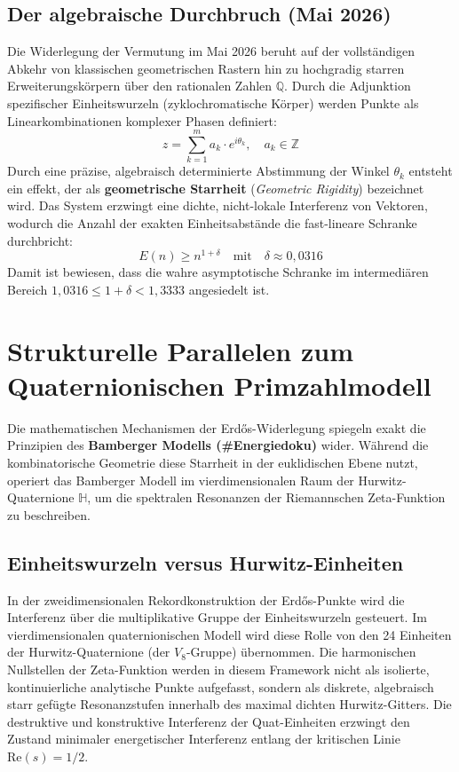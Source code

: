 \documentclass[11pt,a4paper]{article}
\begin{document}
\subsection{Der algebraische Durchbruch (Mai 2026)}
Die Widerlegung der Vermutung im Mai 2026 beruht auf der vollständigen Abkehr von klassischen geometrischen Rastern hin zu hochgradig starren Erweiterungskörpern über den rationalen Zahlen $\mathbb{Q}$. Durch die Adjunktion spezifischer Einheitswurzeln (zyklochromatische Körper) werden Punkte als Linearkombinationen komplexer Phasen definiert:
\begin{equation}
z = \sum_{k=1}^{m} a_k \cdot e^{i \theta_k}, \quad a_k \in \mathbb{Z}
\end{equation}
Durch eine präzise, algebraisch determinierte Abstimmung der Winkel $\theta_k$ entsteht ein effekt, der als \textbf{geometrische Starrheit} (\textit{Geometric Rigidity}) bezeichnet wird. Das System erzwingt eine dichte, nicht-lokale Interferenz von Vektoren, wodurch die Anzahl der exakten Einheitsabstände die fast-lineare Schranke durchbricht:
\begin{equation}
E(n) \ge n^{1 + \delta} \quad \text{mit} \quad \delta \approx 0,0316
\end{equation}
Damit ist bewiesen, dass die wahre asymptotische Schranke im intermediären Bereich $1,0316 \le 1 + \delta < 1,3333$ angesiedelt ist.

\section{Strukturelle Parallelen zum Quaternionischen Primzahlmodell}
Die mathematischen Mechanismen der Erd\H{o}s-Widerlegung spiegeln exakt die Prinzipien des \textbf{Bamberger Modells (\#Energiedoku)} wider. Während die kombinatorische Geometrie diese Starrheit in der euklidischen Ebene nutzt, operiert das Bamberger Modell im vierdimensionalen Raum der Hurwitz-Quaternione $\mathbb{H}$, um die spektralen Resonanzen der Riemannschen Zeta-Funktion zu beschreiben.

\subsection{Einheitswurzeln versus Hurwitz-Einheiten}
In der zweidimensionalen Rekordkonstruktion der Erd\H{o}s-Punkte wird die Interferenz über die multiplikative Gruppe der Einheitswurzeln gesteuert. Im vierdimensionalen quaternionischen Modell wird diese Rolle von den 24 Einheiten der Hurwitz-Quaternione (der $V_8$-Gruppe) übernommen. 
Die harmonischen Nullstellen der Zeta-Funktion werden in diesem Framework nicht als isolierte, kontinuierliche analytische Punkte aufgefasst, sondern als diskrete, algebraisch starr gefügte Resonanzstufen innerhalb des maximal dichten Hurwitz-Gitters. Die destruktive und konstruktive Interferenz der Quat-Einheiten erzwingt den Zustand minimaler energetischer Interferenz entlang der kritischen Linie $\text{Re}(s) = 1/2$.
\end{document}
